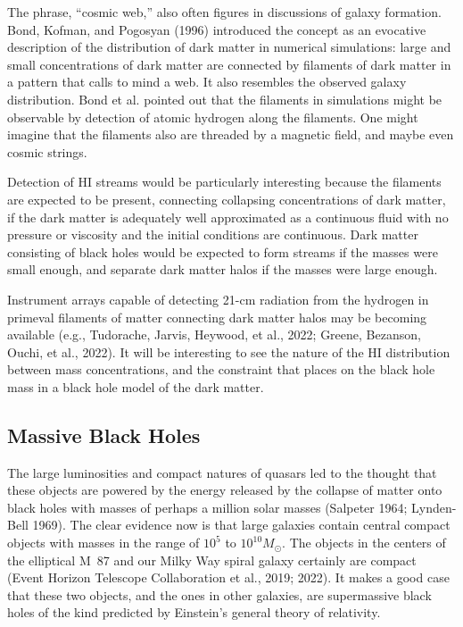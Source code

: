 \documentclass[fleqn,12pt]{article}
\begin{document}
The phrase, ``cosmic web,'' also often figures in discussions of galaxy formation.  Bond, Kofman, and Pogosyan (1996) introduced the concept as an evocative description of the distribution of dark matter in numerical simulations: large and small concentrations of dark matter are connected by filaments of dark matter in a pattern that calls to mind a web. It also resembles the observed galaxy distribution. Bond et al. pointed out that the filaments in simulations might be observable by detection of atomic hydrogen along the filaments. One might imagine that the filaments also are threaded by a magnetic field, and maybe even cosmic strings. 

Detection of HI streams would be particularly interesting because the filaments are expected to be present, connecting collapsing concentrations of dark matter, if the dark matter is adequately well approximated as a continuous fluid with no pressure or viscosity and the initial conditions are continuous. Dark matter consisting of black holes would be expected to form streams if the masses were small enough, and separate dark matter halos if the masses were large enough.

Instrument arrays capable of detecting 21-cm radiation from the hydrogen in  primeval filaments of matter connecting dark matter halos may be becoming available (e.g., Tudorache, Jarvis, Heywood, et al., 2022; Greene, Bezanson, Ouchi, et al., 2022). It will be interesting to see the nature of the H{\small I} distribution between mass concentrations, and the constraint that places on the black hole mass in a black hole model of the dark matter. 

\subsection{Massive Black Holes}\label{massiveblackholes}

The large luminosities and compact natures of quasars led to the thought that these objects are powered by the energy released by the collapse of matter onto black holes with masses of perhaps a million solar masses (Salpeter 1964; Lynden-Bell 1969). The clear evidence now is that large galaxies contain central compact objects with masses in the range of $10^5$ to $10^{10} M_\odot$. The objects in the centers of the elliptical M~87 and our Milky Way spiral galaxy certainly are compact (Event Horizon Telescope Collaboration et al., 2019; 2022). It makes a good case that these two objects, and the ones in other galaxies, are supermassive black holes of the kind predicted by Einstein's general theory of relativity.
\end{document}
